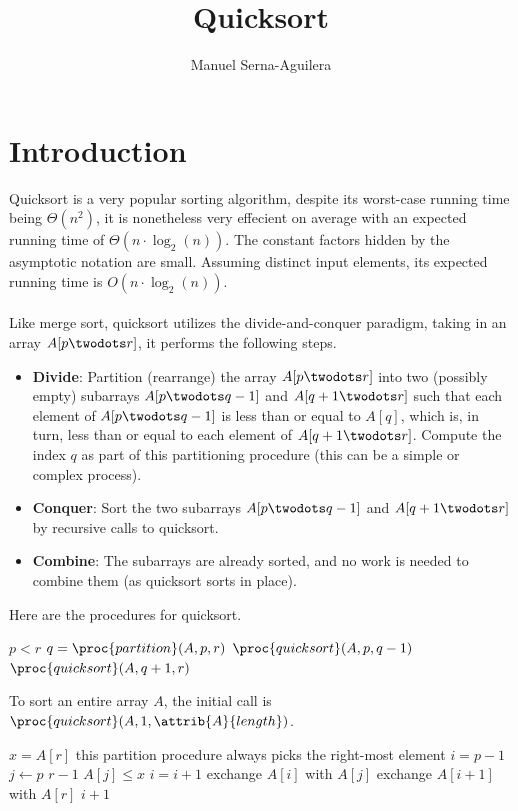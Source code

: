 \documentclass[12pt]{article}
\title{Quicksort}
\author{Manuel Serna-Aguilera}
\date{}
\begin{document}
\maketitle

\section*{Introduction}
Quicksort is a very popular sorting algorithm, despite its worst-case running time being $\Theta{(n^2)}$, it is nonetheless very effecient on average with an expected running time of $\Theta{(n \cdot \log_2(n))}$. The constant factors hidden by the asymptotic notation are small. Assuming distinct input elements, its expected running time is $O{(n \cdot \log_2(n))}$.
\\ \\
Like merge sort, quicksort utilizes the divide-and-conquer paradigm, taking in an array $A[p \twodots r]$, it performs the following steps.
\begin{itemize}
    \item[] \textbf{Divide}: Partition (rearrange) the array $A[p \twodots r]$ into two (possibly empty) subarrays $A[p \twodots q-1]$ and $A[q+1 \twodots r]$ such that each element of $A[p \twodots q-1]$ is less than or equal to $A[q]$, which is, in turn, less than or equal to each element of $A[q+1 \twodots r]$. Compute the index $q$ as part of this partitioning procedure (this can be a simple or complex process).
    \item[] \textbf{Conquer}: Sort the two subarrays $A[p \twodots q-1]$ and $A[q+1 \twodots r]$ by recursive calls to quicksort.
    \item[] \textbf{Combine}: The subarrays are already sorted, and no work is needed to combine them (as quicksort sorts in place).
\end{itemize}

\newpage

Here are the procedures for quicksort.

\begin{codebox}
\li \If $p < r$
\li \Then
        $q = \proc{partition}(A, p, r)$
\li     $\proc{quicksort}(A, p, q-1)$
\li     $\proc{quicksort}(A, q+1, r)$
    \End
\end{codebox}

To sort an entire array $A$, the initial call is $\proc{quicksort}(A, 1, \attrib{A}{length})$.

\begin{codebox}
\li $x = A[r]$ \Comment this partition procedure always picks the right-most element 
\li $i = p-1$
\li \For $j \gets p$ \To $r-1$
    \Do
\li     \If $A[j] \leq x$
            \Then
\li             $i = i + 1$
\li             exchange $A[i]$ with $A[j]$
            \End
    \End
\li exchange $A[i+1]$ with $A[r]$
\li \Return $i + 1$
\end{codebox}
\end{document}
